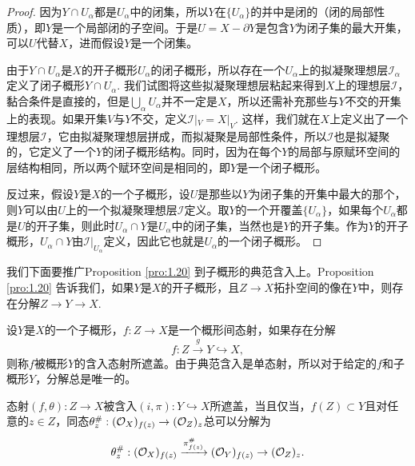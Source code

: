 \begin{proof}
	因为$Y\cap U_\alpha$都是$U_\alpha$中的闭集，所以$Y$在$\{U_\alpha\}$的并中是闭的（闭的局部性质），即$Y$是一个局部闭的子空间。于是$U=X-\partial Y$是包含$Y$为闭子集的最大开集，可以$U$代替$X$，进而假设$Y$是一个闭集。
	
	由于$Y\cap U_\alpha$是$X$的开子概形$U_\alpha$的闭子概形，所以存在一个$U_\alpha$上的拟凝聚理想层$\mathscr I_\alpha$定义了闭子概形$Y\cap U_\alpha$. 我们试图将这些拟凝聚理想层粘起来得到$X$上的理想层$\mathscr I$，黏合条件是直接的，但是$\bigcup_\alpha U_\alpha$并不一定是$X$，所以还需补充那些与$Y$不交的开集上的表现。如果开集$V$与$Y$不交，定义$\mathscr I|_V=X|_V$. 这样，我们就在$X$上定义出了一个理想层$\mathscr I$，它由拟凝聚理想层拼成，而拟凝聚是局部性条件，所以$\mathscr I$也是拟凝聚的，它定义了一个$Y$的闭子概形结构。同时，因为在每个$Y$的局部与原赋环空间的层结构相同，所以两个赋环空间是相同的，即$Y$是一个闭子概形。

	反过来，假设$Y$是$X$的一个子概形，设$U$是那些以$Y$为闭子集的开集中最大的那个，则$Y$可以由$U$上的一个拟凝聚理想层$\mathscr I$定义。取$Y$的一个开覆盖$\{U_\alpha\}$，如果每个$U_\alpha$都是$U$的开子集，则此时$U_\alpha\cap Y$是$U_\alpha$中的闭子集，当然也是$Y$的开子集。作为$Y$的开子概形，$U_\alpha\cap Y$由$\mathscr I|_{U_\alpha}$定义，因此它也就是$U_\alpha$的一个闭子概形。
\end{proof}

我们下面要推广Proposition \ref{pro:1.20} 到子概形的典范含入上。Proposition \ref{pro:1.20} 告诉我们，如果$Y$是$X$的开子概形，且$Z\to X$拓扑空间的像在$Y$中，则存在分解$Z\to Y\to X$. %

\begin{para}
设$Y$是$X$的一个子概形，$f:Z\to X$是一个概形间态射，如果存在分解
\[
	f:Z\xrightarrow{g} Y\hookrightarrow X,
\]
则称$f$被概形$Y$的含入态射所遮盖。由于典范含入是单态射，所以对于给定的$f$和子概形$Y$，分解总是唯一的。
\end{para}

\begin{pro}\label{pro:3.3.11}
态射$(f,\theta):Z\to X$被含入$(i,\pi):Y\hookrightarrow X$所遮盖，当且仅当，$f(Z)\subset Y$且对任意的$z\in Z$，同态$\theta^\#_z:(\mathcal{O}_{X})_{f(z)}\to (\mathcal{O}_{Z})_z$总可以分解为
\[
	\theta^\#_z:(\mathcal{O}_{X})_{f(z)}\xrightarrow{\pi^\#_{f(z)}} (\mathcal{O}_Y)_{f(z)}\to (\mathcal{O}_{Z})_z.
\]
\end{pro}

